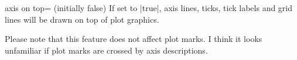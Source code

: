 \begin{pgfplotskey}{axis on top= (initially false)}
    If set to |true|, axis lines, ticks, tick labels and grid lines will be
    drawn on top of plot graphics.
\begin{codeexample}[]
\end{codeexample}

\begin{codeexample}[]
\end{codeexample}
    Please note that this feature does not affect plot marks. I think it looks
    unfamiliar if plot marks are crossed by axis descriptions.
\end{pgfplotskey}

